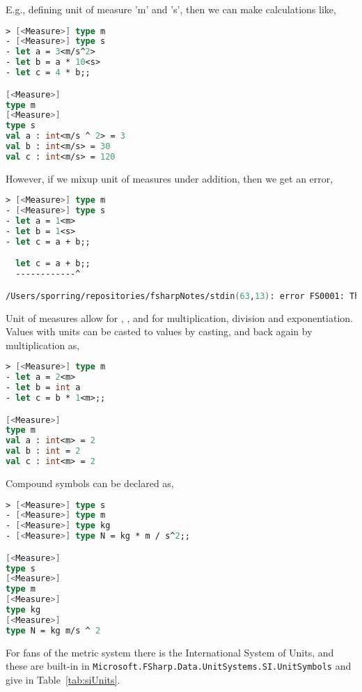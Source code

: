 E.g., defining unit of measure 'm' and 's', then we can make calculations like,
%
\begin{lstlisting}[language=fsharp,caption={fsharpi, floating point and integer numbers may be assigned unit of measures.}]
> [<Measure>] type m
- [<Measure>] type s 
- let a = 3<m/s^2>
- let b = a * 10<s>
- let c = 4 * b;;

[<Measure>]
type m
[<Measure>]
type s
val a : int<m/s ^ 2> = 3
val b : int<m/s> = 30
val c : int<m/s> = 120
\end{lstlisting}
However, if we mixup unit of measures under addition, then we get an error,
%
\begin{lstlisting}[language=fsharp,caption={fsharpi, unit of measures adds an extra layer of types for syntax checking at compile time.}]
> [<Measure>] type m 
- [<Measure>] type s 
- let a = 1<m>
- let b = 1<s>
- let c = a + b;;

  let c = a + b;;
  ------------^

/Users/sporring/repositories/fsharpNotes/stdin(63,13): error FS0001: The unit of measure 's' does not match the unit of measure 'm'
\end{lstlisting}
Unit of measures allow for \token{*}, \token{/}, and \token{^} for multiplication, division and exponentiation. Values with units can be casted to  values by casting, and back again by multiplication as,
%
\begin{lstlisting}[language=fsharp,caption={fsharpi, type casting unit of measures.}]
> [<Measure>] type m      
- let a = 2<m>            
- let b = int a           
- let c = b * 1<m>;;

[<Measure>]
type m
val a : int<m> = 2
val b : int = 2
val c : int<m> = 2
\end{lstlisting}
Compound symbols can be declared as,
%
\begin{lstlisting}[language=fsharp,caption={fsharpi, aggregated unit of measures.}]
> [<Measure>] type s         
- [<Measure>] type m
- [<Measure>] type kg
- [<Measure>] type N = kg * m / s^2;;

[<Measure>]
type s
[<Measure>]
type m
[<Measure>]
type kg
[<Measure>]
type N = kg m/s ^ 2
\end{lstlisting}
For fans of the metric system there is the International System of Units, and these are built-in in \lstinline|Microsoft.FSharp.Data.UnitSystems.SI.UnitSymbols| and give in Table~\ref{tab:siUnits}.
